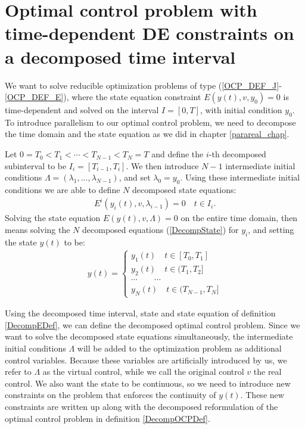 \section{Optimal control problem with time-dependent DE constraints on a decomposed time interval} \label{decomp_sec}
We want to solve reducible optimization problems of type (\ref{OCP_DEF_J}-\ref{OCP_DEF_E}), where the state equation constraint $E(y(t),v,y_0)=0$ is time-dependent and solved on the interval $I=[0,T]$, with initial condition $y_0$. To introduce parallelism to our optimal control problem, we need to decompose the time domain and the state equation as we did in chapter \ref{parareal_chap}. 
\begin{definition} \label{DecompEDef}
Let $0=T_0<T_1<\cdots<T_{N-1}<T_N=T$ and define the $i$-th decomposed subinterval to be $I_i=[T_{i-1},T_i]$. We then introduce $N-1$ intermediate initial conditions $\Lambda=(\lambda_1,...,\lambda_{N-1})$, and set $\lambda_0=y_0$. Using these intermediate initial conditions we are able to define $N$ decomposed state equations:
\begin{align}
E^i(y_i(t),v,\lambda_{i-1})= 0 \quad t\in I_i. \label{DecompState}
\end{align} 
Solving the state equation $E(y(t),v,\Lambda)=0$ on the entire time domain, then means solving the $N$ decomposed equations (\ref{DecompState}) for $y_i$, and setting the state $y(t)$ to be:
\begin{align}
 y(t)=\left\{
     \begin{array}{lr}
		y_1(t)\quad t\in [T_0,T_1] \\
		y_2(t)\quad t\in(T_1,T_2] \\
		\cdots \quad\quad\cdots\\
		y_N(t)\quad t\in(T_{N-1},T_N]
	\end{array}
   \right.	\label{GatherState}
\end{align}
\end{definition}
\noindent
Using the decomposed time interval, state and state equation of definition \ref{DecompEDef}, we can define the decomposed optimal control problem. Since we want to solve the decomposed state equations simultaneously, the intermediate initial conditions $\Lambda$ will be added to the optimization problem as additional control variables. Because these variables are artificially introduced by us, we refer to $\Lambda$ as the virtual control, while we call the original control $v$ the real control. We also want the state to be continuous, so we need to introduce new constraints on the problem that enforces the continuity of $y(t)$. These new constraints are written up along with the decomposed reformulation of the optimal control problem in definition \ref{DecompOCPDef}.
